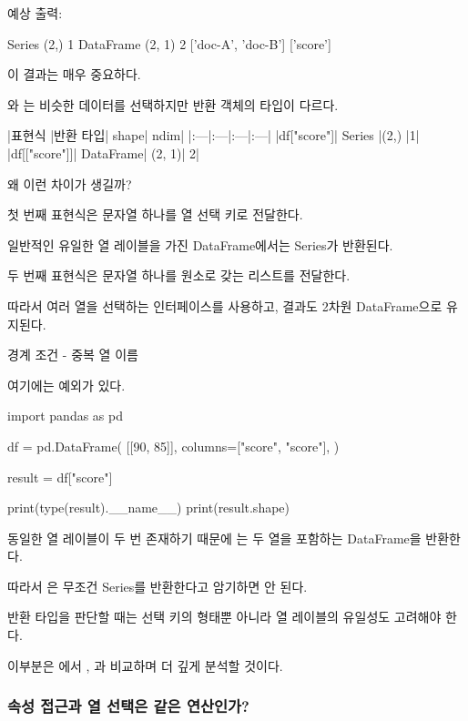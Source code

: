예상 출력:

\begin{dhkzsh}
Series
(2,)
1
DataFrame
(2, 1)
2
['doc-A', 'doc-B']
['score']
\end{dhkzsh}

이 결과는 매우 중요하다.

와 는 비슷한 데이터를 선택하지만 반환 객체의 타입이 다르다.

\begin{dhktable}
|표현식	|반환 타입|	shape|	ndim|
|:---|:---|:---|:---|
|df["score"]|	Series	|(2,)	|1|
|df[["score"]]|	DataFrame|	(2, 1)|	2|
\end{dhktable}

왜 이런 차이가 생길까?

첫 번째 표현식은 문자열 하나를 열 선택 키로 전달한다.

일반적인 유일한 열 레이블을 가진 DataFrame에서는 Series가 반환된다.

두 번째 표현식은 문자열 하나를 원소로 갖는 리스트를 전달한다.

따라서 여러 열을 선택하는 인터페이스를 사용하고, 결과도 2차원 DataFrame으로 유지된다.

\begin{dhknote}
\begin{dhksmry}[centered]
경계 조건 - 중복 열 이름
\end{dhksmry}
\end{dhknote}

여기에는 예외가 있다.

\begin{dhkcode}
import pandas as pd

df = pd.DataFrame(
    [[90, 85]],
    columns=["score", "score"],
)

result = df["score"]

print(type(result).__name__)
print(result.shape)
\end{dhkcode}

동일한 열 레이블이 두 번 존재하기 때문에 는 두 열을 포함하는 DataFrame을 반환한다.

따라서 은 무조건 Series를 반환한다고 암기하면 안 된다.

반환 타입을 판단할 때는 선택 키의 형태뿐 아니라 열 레이블의 유일성도 고려해야 한다.

이부분은 에서 , 과 비교하며 더 깊게 분석할 것이다.

\subsubsection{속성 접근과 열 선택은 같은 연산인가?}

